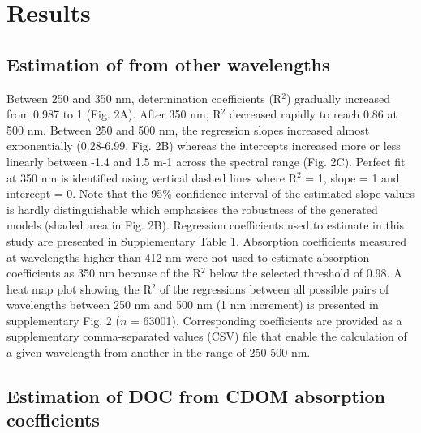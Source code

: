 
\section*{Results}
\label{sec:Results}

\subsection*{Estimation of  from other wavelengths}

Between 250 and 350 nm, determination coefficients (R$^2$) gradually increased from 0.987 to 1 (Fig. 2A). After 350 nm, R$^2$ decreased rapidly to reach 0.86 at 500 nm. Between 250 and 500 nm, the regression slopes increased almost exponentially (0.28-6.99, Fig. 2B) whereas the intercepts increased more or less linearly between -1.4 and 1.5 m-1 across the spectral range (Fig. 2C). Perfect fit at 350 nm is identified using vertical dashed lines where R$^2$ = 1, slope = 1 and intercept = 0. Note that the 95\% confidence interval of the estimated slope values is hardly distinguishable which emphasises the robustness of the generated models (shaded area in Fig. 2B). Regression coefficients used to estimate  in this study are presented in Supplementary Table 1. Absorption coefficients measured at wavelengths higher than 412 nm were not used to estimate absorption coefficients as 350 nm because of the R$^2$ below the selected threshold of 0.98. A heat map plot showing the R$^2$ of the regressions between all possible pairs of wavelengths between 250 nm and 500 nm (1 nm increment) is presented in supplementary Fig. 2 ($n$ = 63001). Corresponding coefficients are provided as a supplementary comma-separated values (CSV) file that enable the calculation of a given wavelength from another in the range of 250-500 nm.

\subsection*{Estimation of DOC from CDOM  absorption coefficients}

